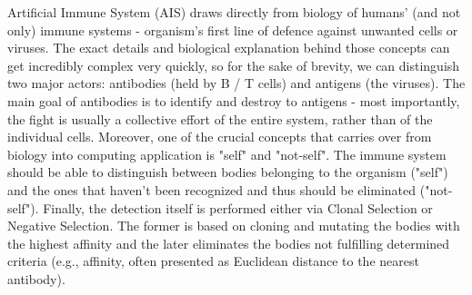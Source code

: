 \documentclass[letterpaper, 10 pt, conference]{ieeeconf}  %
\begin{document}
Artificial Immune System (AIS) draws directly from biology of humans' (and not only) immune systems - organism's first line of defence against unwanted cells or viruses. The exact details and biological explanation behind those concepts can get incredibly complex very quickly, so for the sake of brevity, we can distinguish two major actors: antibodies (held by B / T cells) and antigens (the viruses). The main goal of antibodies is to identify and destroy to antigens - most importantly, the fight is usually a collective effort of the entire system, rather than of the individual cells. Moreover, one of the crucial concepts that carries over from biology into computing application is "self" and "not-self". The immune system should be able to distinguish between bodies belonging to the organism ("self") and the ones that haven't been recognized and thus should be eliminated ("not-self"). Finally, the detection itself is performed either via Clonal Selection or Negative Selection. The former is based on cloning and mutating the bodies with the highest affinity and the later eliminates the bodies not fulfilling determined criteria (e.g., affinity, often presented as Euclidean distance to the nearest antibody).
\end{document}
